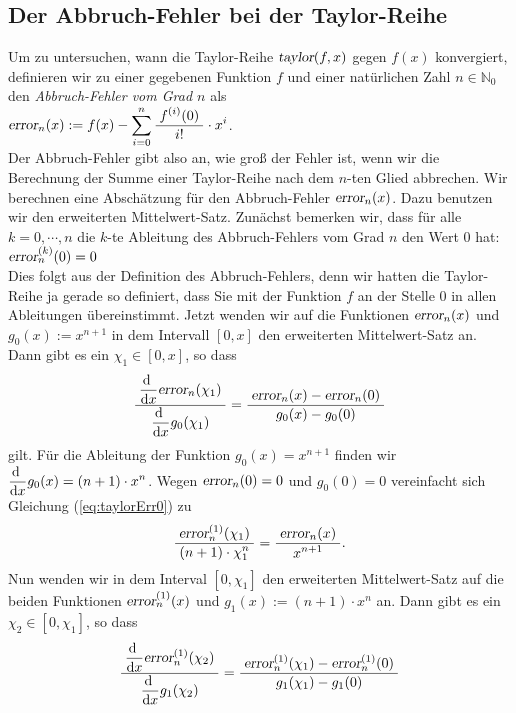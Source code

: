 \subsection{Der Abbruch-Fehler bei der Taylor-Reihe}
Um zu untersuchen, wann die Taylor-Reihe $\textsl{taylor}(f,x)$ gegen $f(x)$
konvergiert, definieren wir zu einer gegebenen Funktion $f$ und einer nat\"urlichen Zahl
$n\in \mathbb{N}_0$ den \emph{Abbruch-Fehler vom Grad $n$} als
\\[0.3cm]
\hspace*{1.3cm}
$\textsl{error}_n(x) := f(x) - \displaystyle\sum\limits_{i=0}^n \bruch{f^{(i)}(0)}{i!} \cdot  x^i$.
\\[0.3cm]
Der Abbruch-Fehler gibt also an, wie gro{\ss} der Fehler ist, wenn wir die Berechnung der Summe einer
Taylor-Reihe nach dem $n$-ten Glied abbrechen.
Wir berechnen  eine Absch\"atzung f\"ur den Abbruch-Fehler
$\textsl{error}_n(x)$.  Dazu benutzen wir den erweiterten Mittelwert-Satz.
Zun\"achst bemerken wir, dass f\"ur alle $k=0,\cdots,n$ die $k$-te Ableitung
des Abbruch-Fehlers vom Grad $n$ den Wert 0 hat:
\\[0.3cm]
\hspace*{1.3cm}
$\textsl{error}_n^{(k)}(0) = 0$
\\[0.3cm]
Dies folgt aus der Definition des Abbruch-Fehlers, denn wir hatten die Taylor-Reihe ja
gerade so definiert, dass Sie mit der Funktion $f$ an der Stelle $0$ in allen Ableitungen
\"ubereinstimmt.   
Jetzt wenden wir auf die Funktionen $\textsl{error}_n(x)$ und $g_0(x) := x^{n+1}$ in dem Intervall
$[0,x]$ den erweiterten 
Mittelwert-Satz an.  Dann gibt es ein $\chi_1 \in [0,x]$, so dass 
\begin{equation}
  \label{eq:taylorErr0}  
\bruch{\dfo \err{\chi_1}}{ \dfo g_0(\chi_1)} = \bruch{\textsl{error}_n(x) - \textsl{error}_n(0)}{g_0(x) - g_0(0)}
\end{equation}
gilt. 
F\"ur die Ableitung der Funktion $g_0(x) = x^{n+1}$ finden wir $\dfo g_0(x) = (n+1) \cdot  x^n$.
Wegen $\err{0} = 0$ und $g_0(0) = 0$  vereinfacht sich Gleichung (\ref{eq:taylorErr0}) zu
\begin{equation}
  \label{eq:taylorErr0a}
   \bruch{\erri{\chi_1}{1}}{(n+1)\cdot \chi_1^n} = \bruch{\textsl{error}_n(x)}{x^{n+1}}.  
\end{equation}
Nun wenden wir in dem Interval $[0,\chi_1]$ den erweiterten  Mittelwert-Satz 
auf die beiden Funktionen $\erri{x}{1}$ und 
$g_1(x) := (n+1)\cdot x^n$ an.  Dann gibt es ein $\chi_2 \in[0,\chi_1]$, so dass
\begin{equation}
  \label{eq:taylorErr1}  
\bruch{\dfo \erri{\chi_2}{1}}{ \dfo g_1(\chi_2)} = \bruch{\erri{\chi_1}{1} - \erri{0}{1}}{g_1(\chi_1) - g_1(0)}
\end{equation}
